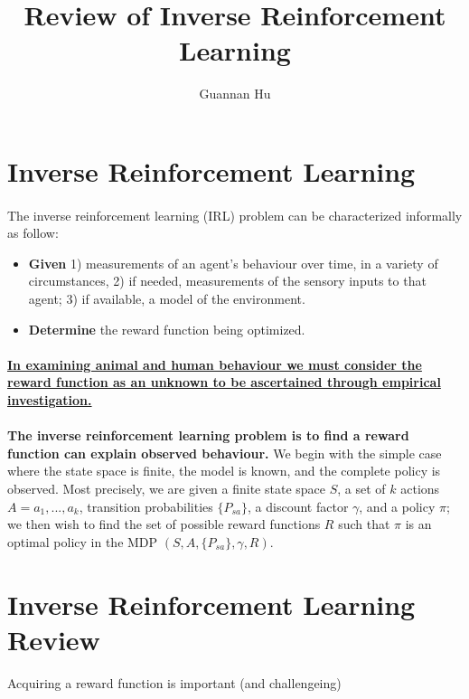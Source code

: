 \documentclass[12pt,a4paper]{article}
\begin{document}
\title{Review of Inverse Reinforcement Learning}
\author{Guannan Hu}
\maketitle

\section{Inverse Reinforcement Learning}
\paragraph{}The inverse reinforcement learning (IRL) problem can be characterized informally as follow:
\begin{itemize}
	\item[] \textbf{Given} 1) measurements of an agent's behaviour over time, in a variety of circumstances, 2) if needed, measurements of the sensory inputs to that agent; 3) if available, a model of the environment.
	\item[] \textbf{Determine} the reward function being optimized.
\end{itemize} 

\paragraph{} \textbf{\uline{In examining animal and human behaviour we must consider the reward function as an unknown to be ascertained through empirical investigation.}}

\paragraph{} 
\begin{tcolorbox}
\textbf{The inverse reinforcement learning problem is to find a reward function can explain observed behaviour.} We begin with the simple case where the state space is finite, the model is known, and the complete policy is observed. Most precisely, we are given a finite state space $S$, a set of $k$ actions $A = {a_1, ..., a_{k}}$, transition probabilities $\{P_{sa}\}$, a discount factor $\gamma$, and a policy $\pi$; we then wish to find the set of possible reward functions $R$ such that $\pi$ is an optimal policy in the MDP $(S, A, \{P_{sa}\}, \gamma, R)$.
\end{tcolorbox}

\newpage
\section{Inverse Reinforcement Learning Review}
\begin{center}
Acquiring a reward function is important (and challengeing)
\end{center}
\end{document}
